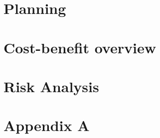 \documentclass[11pt, a4paper]{report}
\begin{document}
\chapter{Planning}
	

\chapter{Cost-benefit overview}
	

\chapter{Risk Analysis}
	

\printbibliography[
heading=bibintoc,
title={Bibliography}
]


\appendix

\chapter{Appendix A}
\end{document}
